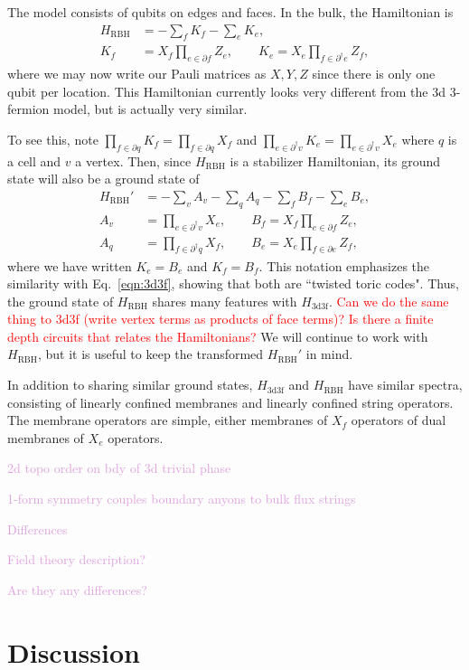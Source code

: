 \documentclass[twocolumn, longbibliography]{revtex4-2}
\newcommand{\note}[1]{\textcolor{red}{#1}}
\newcommand{\outline}[1]{\textcolor{Plum}{#1}}
\newcommand{\nn}{\nonumber\\}
\newcommand{\RBH}{\text{RBH}}
\newcommand{\tdtf}{\text{3d3f}}
\begin{document}
The model consists of qubits on edges and faces. In the bulk, the Hamiltonian is 
\begin{align}
H_\RBH &= -\sum_f K_f - \sum_e K_e,\\
K_f &= X_f\prod_{e\in\partial f}Z_e,\qquad K_e = X_e 
\prod_{f\in \partial^\dagger e}Z_f,
\end{align}
where we may now write our Pauli matrices as $X,Y,Z$ since there is only one qubit per location. This Hamiltonian currently looks very different from the 3d 3-fermion model, but is actually very similar. 
	
To see this, note $\prod_{f\in \partial q}K_f = \prod_{f\in \partial q}X_f$ and $\prod_{e\in \partial^\dagger v} K_e = \prod_{e\in \partial^\dagger v} X_e$ where $q$ is a cell and $v$ a vertex. Then, since $H_\RBH$ is a stabilizer Hamiltonian, its ground state will also be a ground state of 
\begin{align}
H_\RBH' &= -\sum_vA_v - \sum_qA_q -\sum_fB_f-\sum_eB_e,\nn
A_v &= \prod_{e\in\partial^\dagger v}X_e,\qquad B_f = 
X_f\prod_{e\in\partial f}Z_e,\nn
A_q &= \prod_{f\in\partial^\dagger q}X_f,\qquad B_e = 
X_e\prod_{f\in\partial e}Z_f, \label{eqn:RBH}
\end{align}
where we have written $K_e=B_e$ and $K_f=B_f$. This notation emphasizes the similarity with Eq.~\ref{eqn:3d3f}, showing that both are ``twisted toric codes". Thus, the ground state of $H_\RBH$ shares many features with $H_\tdtf$. \note{Can we do the same thing to 3d3f (write vertex terms as products of face terms)? Is there a finite depth circuits that relates the Hamiltonians?} We will continue to work with $H_\RBH$, but it is useful to keep the transformed $H_\RBH'$ in mind.
	
In addition to sharing similar ground states, $H_\tdtf$ and $H_\RBH$ have similar spectra, consisting of linearly confined membranes and linearly confined string operators. The membrane operators are simple, either membranes of $X_f$ operators of dual membranes of $X_e$ operators. 
	
\outline{2d topo order on bdy of 3d trivial phase}
	
\outline{1-form symmetry couples boundary anyons to bulk flux strings}
	
\outline{Differences}
	
\outline{Field theory description?}
	
\outline{Are they any differences?}
	
\section{Discussion}
	
\end{document}

